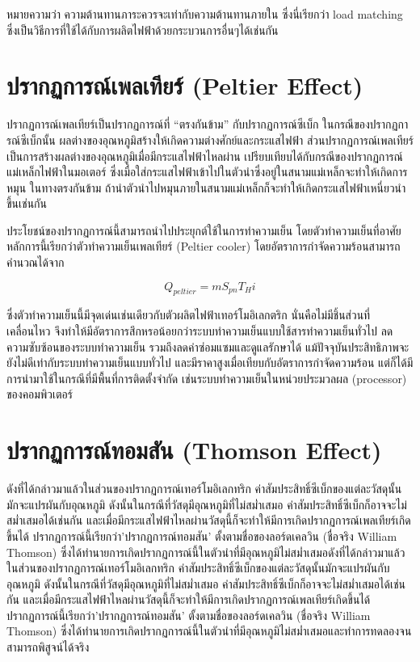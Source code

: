\documentclass[a4paper,nobib,openany]{tufte-book}
\begin{document}
หมายความว่า ความต้านทานภาระควรจะเท่ากับความต้านทานภายใน ซึ่งนี่เรียกว่า
load matching
ซึ่งเป็นวิธีการที่ใช้ได้กับการผลิตไฟฟ้าด้วยกระบวนการอื่นๆได้เช่นกัน

\section{ปรากฏการณ์เพลเทียร์ (Peltier Effect)}
\label{sec:org3543669}
ปรากฏการณ์เพลเทียร์เป็นปรากฏการณ์ที่ ``ตรงกันข้าม'' กับปรากฏการณ์ซีเบ็ก
ในกรณีของปรากฏการณ์ซีเบ็กนั้น
ผลต่างของอุณหภูมิสร้างให้เกิดความต่างศักย์และกระแสไฟฟ้า
ส่วนปรากฏการณ์เพลเทียร์เป็นการสร้างผลต่างของอุณหภูมิเมื่อมีกระแสไฟฟ้าไหลผ่าน
เปรียบเทียบได้กับกรณีของปรากฏการณ์แม่เหล็กไฟฟ้าในมอเตอร์
ซึ่งเมื่อใส่กระแสไฟฟ้าเข้าไปในตัวนำซึ่งอยู่ในสนามแม่เหล็กจะทำให้เกิดการหมุน
ในทางตรงกันข้าม
ถ้านำตัวนำไปหมุนภายในสนามแม่เหล็กก็จะทำให้เกิดกระแสไฟฟ้าเหนี่ยวนำขึ้นเช่นกัน

ประโยชน์ของปรากฏการณ์นี้สามารถนำไปประยุกต์ใช้ในการทำความเย็น
โดยตัวทำความเย็นที่อาศัยหลักการนี้เรียกว่าตัวทำความเย็นเพลเทียร์
(Peltier cooler) โดยอัตราการกำจัดความร้อนสามารถคำนวณได้จาก

\begin{equation}
  Q_{peltier} = m S_{pn} T_H i
\end{equation}

ซึ่งตัวทำความเย็นนี้มีจุดเด่นเช่นเดียวกับตัวผลิตไฟฟ้าเทอร์โมอิเลกตริก
นั่นคือไม่มีชิ้นส่วนที่เคลื่อนไหว
จึงทำให้มีอัตราการสึกหรอน้อยกว่าระบบทำความเย็นแบบใช้สารทำความเย็นทั่วไป
ลดความซับซ้อนของระบบทำความเย็น รวมถึงลดค่าซ่อมแซมและดูแลรักษาได้
แม้ปัจจุบันประสิทธิภาพจะยังไม่ดีเท่ากับระบบทำความเย็นแบบทั่วไป
และมีราคาสูงเมื่อเทียบกับอัตราการกำจัดความร้อน
แต่ก็ได้มีการนำมาใช้ในกรณีที่มีพื้นที่การติดตั้งจำกัด
เช่นระบบทำความเย็นในหน่วยประมวลผล (processor) ของคอมพิวเตอร์

\section{ปรากฏการณ์ทอมสัน (Thomson Effect)}
\label{sec:orga40f299}
ดังที่ได้กล่าวมาแล้วในส่วนของปรากฏการณ์เทอร์โมอิเลกทริก
ค่าสัมประสิทธิ์ซีเบ็กของแต่ละวัสดุนั้นมักจะแปรผันกับอุณหภูมิ
ดังนั้นในกรณีที่วัสดุมีอุณหภูมิที่ไม่สม่ำเสมอ
ค่าสัมประสิทธิ์ซีเบ็กก็อาจจะไม่สม่ำเสมอได้เช่นกัน
และเมื่อมีกระแสไฟฟ้าไหลผ่านวัสดุนี้ก็จะทำให้มีการเกิดปรากฏการณ์เพลเทียร์เกิดขึ้นได้
ปรากฏการณ์นี้เรียกว่า'ปรากฏการณ์ทอมสัน' ตั้งตามชื่อของลอร์ดเคลวิน
(ชื่อจริง William Thomson)
ซึ่งได้ทำนายการเกิดปรากฏการณ์นี้ในตัวนำที่มีอุณหภูมิไม่สม่ำเสมอดังที่ได้กล่าวมาแล้วในส่วนของปรากฏการณ์เทอร์โมอิเลกทริก
ค่าสัมประสิทธิ์ซีเบ็กของแต่ละวัสดุนั้นมักจะแปรผันกับอุณหภูมิ
ดังนั้นในกรณีที่วัสดุมีอุณหภูมิที่ไม่สม่ำเสมอ
ค่าสัมประสิทธิ์ซีเบ็กก็อาจจะไม่สม่ำเสมอได้เช่นกัน
และเมื่อมีกระแสไฟฟ้าไหลผ่านวัสดุนี้ก็จะทำให้มีการเกิดปรากฏการณ์เพลเทียร์เกิดขึ้นได้
ปรากฏการณ์นี้เรียกว่า'ปรากฏการณ์ทอมสัน' ตั้งตามชื่อของลอร์ดเคลวิน
(ชื่อจริง William Thomson)
ซึ่งได้ทำนายการเกิดปรากฏการณ์นี้ในตัวนำที่มีอุณหภูมิไม่สม่ำเสมอและทำการทดลองจนสามารถพิสูจน์ได้จริง
\end{document}
